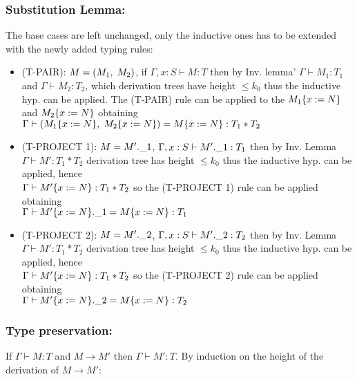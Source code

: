 \subsubsection*{Substitution Lemma:}

The base cases are left unchanged, only the inductive ones has to be
extended with the newly added typing rules:
\begin{itemize}
\item (T-PAIR): \(M = (M_1,\;M_2)\), if \(\Gamma, x: S \vdash M: T\)
  then by Inv. lemma' \(\Gamma \vdash M_1: T_1\) and \(\Gamma \vdash M_2:
  T_2\), which derivation trees have height \(\le k_0\) thus the
  inductive hyp. can be applied. The (T-PAIR) rule can be applied to
  the \(M_1\{x:=N\}\) and \(M_2\{x:=N\}\) obtaining\\ \(\Gamma
  \vdash (M_1\{x:=N\},\;M_2\{x:=N\}) = M\{x:=N\} : T_1
  * T_2\)
\item (T-PROJECT 1): \(M = M'.\_1\), \(\Gamma, x:S \vdash M'.\_1 :
  T_1\) then by Inv. Lemma \(\Gamma \vdash M' : T_1 \ast T_2\) derivation
  tree has height \(\le k_0\) thus the inductive hyp. can be applied,
  hence\\ \(\Gamma \vdash M'\{x:=N\}: T_1 \ast T_2\) so the
  (T-PROJECT 1) rule can be applied obtaining\\ \(\Gamma \vdash
  M'\{x:=N\}.\_1 = M\{x:=N\}: T_1\)
\item (T-PROJECT 2): \(M = M'.\_2\), \(\Gamma, x:S \vdash M'.\_2 :
  T_2\) then by Inv. Lemma \(\Gamma \vdash M' : T_1 \ast T_2\) derivation
  tree has height \(\le k_0\) thus the inductive hyp. can be applied,
  hence\\ \(\Gamma \vdash M'\{x:=N\}: T_1 \ast T_2\) so the
  (T-PROJECT 2) rule can be applied obtaining\\ \(\Gamma \vdash
  M'\{x:=N\}.\_2 = M\{x:=N\}: T_2\)
\end{itemize}

\subsubsection*{Type preservation:}
If \(\Gamma \vdash M: T\) and \(M \to M'\) then \(\Gamma \vdash M': T\). By
induction on the height of the derivation of \(M \to M'\):

